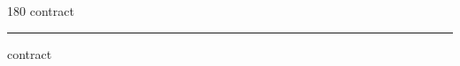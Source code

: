 
\begin{frame}
\begin{center}
\begin{turn}{180}
{\fontsize{2.5cm}{1em}\selectfont contract}
\end{turn}
\vspace{1em}\par  
\hrule
\vspace{1em}\par  
{\fontsize{2.5cm}{1em}\selectfont contract}
\end{center}
\end{frame}
